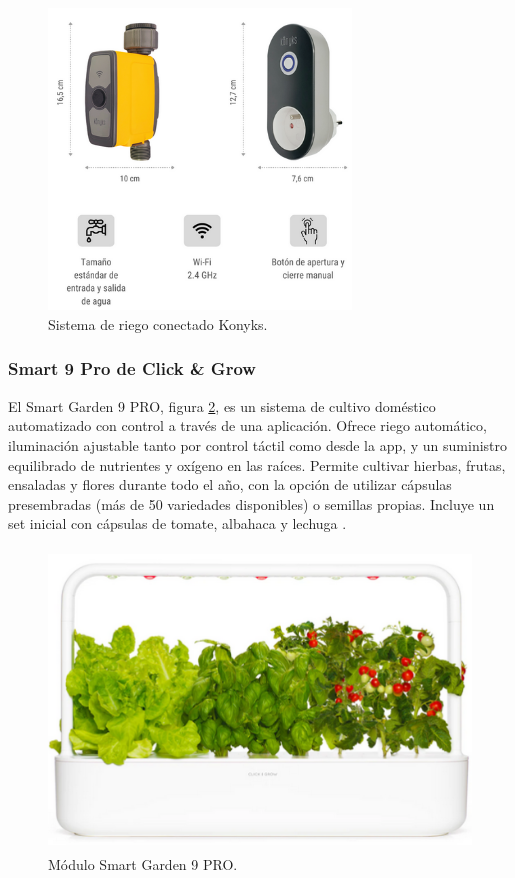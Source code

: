 \begin{figure}[h]
	\centering
	\includegraphics[height=8cm]{./Figures/kit_konyks.png}
	\caption{Sistema de riego conectado Konyks\protect\footnotemark.}
	\label{fig:kit_konyks}
\end{figure}





\subsubsection{Smart 9 Pro de Click \& Grow}
El Smart Garden 9 PRO, figura \ref{fig:smart_garden}, es un sistema de cultivo doméstico automatizado con control a través de una aplicación. Ofrece riego automático, iluminación ajustable tanto por control táctil como desde la app, y un suministro equilibrado de nutrientes y oxígeno en las raíces. Permite cultivar hierbas, frutas, ensaladas y flores durante todo el año, con la opción de utilizar cápsulas presembradas (más de 50 variedades disponibles) o semillas propias. Incluye un set inicial con cápsulas de tomate, albahaca y lechuga \cite{SMART:9}.

\begin{figure}[h]
	\centering
	\includegraphics[height=8cm]{./Figures/smart_garden.png}
	\caption{Módulo Smart Garden 9 PRO\protect\footnotemark.}
	\label{fig:smart_garden}
\end{figure}

